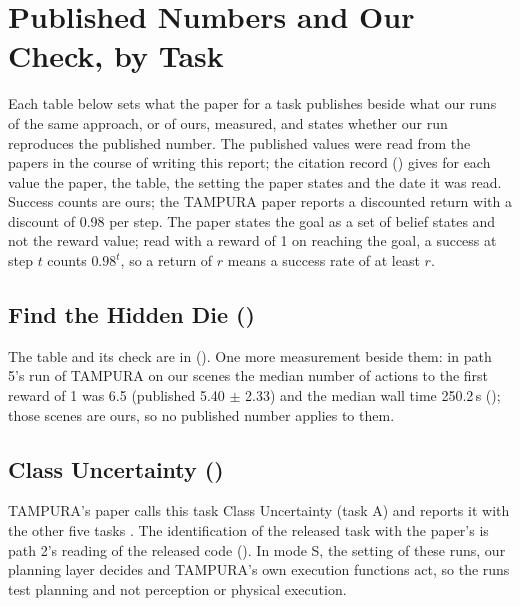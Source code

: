 \section{Published Numbers and Our Check, by Task}
\label{sec:published}

Each table below sets what the paper for a task publishes beside what our runs of
the same approach, or of ours, measured, and states whether our run reproduces the
published number. The published values were read from the papers in the course
of writing this report; the citation record () gives
for each value the paper, the table, the setting the paper states and the date it
was read. Success counts are ours; the TAMPURA paper reports a discounted
return with a discount of 0.98 per step. The paper states the goal as a set of
belief states and not the reward value; read with a reward of 1 on reaching the
goal, a success at step $t$ counts $0.98^t$, so a return of $r$ means a success
rate of at least $r$.

\subsection{Find the Hidden Die (\fdice)}

The table and its check are in 
(). One more measurement beside them: in path 5's run of
TAMPURA on our scenes the median number of actions to the first reward of 1 was 6.5
(published 5.40 $\pm$ 2.33) and the median wall time 250.2\,s (); those
scenes are ours, so no published number applies to them.

\subsection{Class Uncertainty (\cuncert)}

TAMPURA's paper calls this task Class Uncertainty (task A) and reports it with
the other five tasks \cite{curtis2024partially}. The identification of the
released task with the paper's is path 2's reading of the released code
(). In mode S, the setting of these runs, our planning layer decides and
TAMPURA's own execution functions act, so the runs test planning and not
perception or physical execution.

